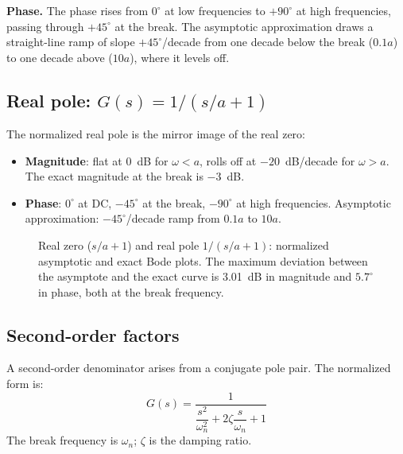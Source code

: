\documentclass[12pt]{article}
\newcommand{\figplaceholder}[2][3in]{%
  \begin{center}
  \fbox{\parbox{#1}{\centering\vspace{0.5in}\textit{[Figure: #2]}\vspace{0.5in}}}
  \end{center}
}
\begin{document}
\textbf{Phase.}  The phase rises from $0^\circ$ at low frequencies to
$+90^\circ$ at high frequencies, passing through $+45^\circ$ at the break.
The asymptotic approximation draws a straight-line ramp of slope
$+45^\circ$/decade from one decade below the break ($0.1a$) to one decade
above ($10a$), where it levels off.

\subsection{Real pole: \texorpdfstring{$G(s) = 1/(s/a + 1)$}{G(s) = 1/(s/a + 1)}}
\label{sec:real_pole}

The normalized real pole is the mirror image of the real zero:
\begin{itemize}
  \item \textbf{Magnitude}: flat at 0~dB for $\omega < a$, rolls off at
    $-20$~dB/decade for $\omega > a$.  The exact magnitude at the break is
    $-3$~dB.
  \item \textbf{Phase}: $0^\circ$ at DC, $-45^\circ$ at the break, $-90^\circ$
    at high frequencies.  Asymptotic approximation: $-45^\circ$/decade ramp
    from $0.1a$ to $10a$.
\end{itemize}

\begin{figure}[htbp]
  \figplaceholder[5in]{Normalized Bode plots for (c)~$G(s)=(s/a+1)$ and
    (d)~$G(s)=1/(s/a+1)$: asymptotic (straight-line) and exact responses.
    [Nise Fig.~10.9c,d]}
  \caption{Real zero ($s/a + 1$) and real pole $1/(s/a + 1)$: normalized
    asymptotic and exact Bode plots.  The maximum deviation between the
    asymptote and the exact curve is 3.01~dB in magnitude and $5.7^\circ$
    in phase, both at the break frequency.}
  \label{fig:blocks_za_1za}
\end{figure}

\subsection{Second-order factors}
\label{sec:second_order}

A second-order denominator arises from a conjugate pole pair.  The normalized
form is:
\begin{equation}
  G(s) = \frac{1}{\dfrac{s^2}{\omega_n^2} + 2\zeta\dfrac{s}{\omega_n} + 1}
  \label{eq:second_order_block}
\end{equation}
The break frequency is $\omega_n$; $\zeta$ is the damping ratio.
\end{document}
